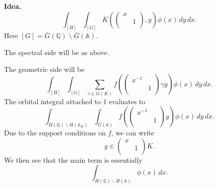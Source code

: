 \documentclass[reqno]{amsart} 
\begin{document}
\textbf{Idea.}
\begin{equation*}
  \int_{[H]}
  \int_{[G]}
  K \left(
    \begin{pmatrix}
      x      &  \\
             & 1 \\
    \end{pmatrix}, y \right)
  \phi(x) \, d y \,d x.
\end{equation*}
Here $[G] = \bar{G}(\mathbb{Q}) \backslash \bar{G}(\mathbb{A})$.

The spectral side will be as above.

The geometric side will be
\begin{equation*}
  \int_{[H]} \int_{[G]}
  \sum_{\gamma \in G(K)} f \left(
    \begin{pmatrix}
      x^{-1}       &  \\
                   & 1 \\
    \end{pmatrix} \gamma y \right)
  \phi(x) \, d y \,d x.
\end{equation*}
The orbital integral attached to $1$ evaluates to
\begin{equation*}
  \int_{H(\mathbb{Q}) \backslash H(\mathbb{A}_K)} \int_{\bar{G}(\mathbb{A})} f \left(
    \begin{pmatrix}
      x^{-1}       &  \\
                   & 1 \\
    \end{pmatrix}
    y
  \right)
  \phi(x) \,d y \,d x.
\end{equation*}
Due to the support conditions on $f$, we can write
\begin{equation*}
  y \in
  \begin{pmatrix}
    x    &  \\
         & 1 \\
  \end{pmatrix} K.
\end{equation*}
We then see that the main term is essentially
\begin{equation*}
  \int_{H(\mathbb{Q}) \backslash H(\mathbb{A})} \phi(x) \,d x.
\end{equation*}
\end{document}
